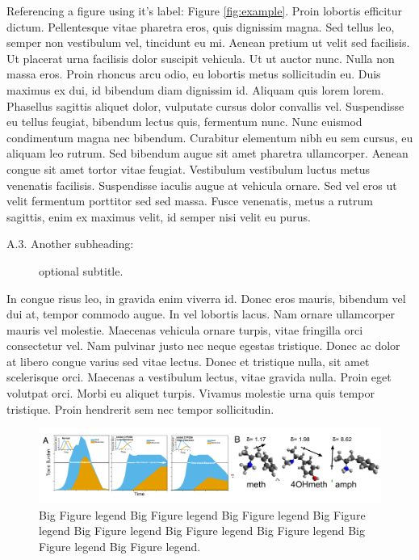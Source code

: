 Referencing a figure using it's label: Figure \ref{fig:example}. Proin lobortis efficitur dictum. Pellentesque vitae pharetra eros, quis dignissim magna. Sed tellus leo, semper non vestibulum vel, tincidunt eu mi. Aenean pretium ut velit sed facilisis. Ut placerat urna facilisis dolor suscipit vehicula. Ut ut auctor nunc. Nulla non massa eros. Proin rhoncus arcu odio, eu lobortis metus sollicitudin eu. Duis maximus ex dui, id bibendum diam dignissim id. Aliquam quis lorem lorem. Phasellus sagittis aliquet dolor, vulputate cursus dolor convallis vel. Suspendisse eu tellus feugiat, bibendum lectus quis, fermentum nunc. Nunc euismod condimentum magna nec bibendum. Curabitur elementum nibh eu sem cursus, eu aliquam leo rutrum. Sed bibendum augue sit amet pharetra ullamcorper. Aenean congue sit amet tortor vitae feugiat. Vestibulum vestibulum luctus metus venenatis facilisis. Suspendisse iaculis augue at vehicula ornare. Sed vel eros ut velit fermentum porttitor sed sed massa. Fusce venenatis, metus a rutrum sagittis, enim ex maximus velit, id semper nisi velit eu purus.

\begin{description}
	\item[A.3. Another subheading:]{optional subtitle.}
\end{description}

In congue risus leo, in gravida enim viverra id. Donec eros mauris, bibendum vel dui at, tempor commodo augue. In vel lobortis lacus. Nam ornare ullamcorper mauris vel molestie. Maecenas vehicula ornare turpis, vitae fringilla orci consectetur vel. Nam pulvinar justo nec neque egestas tristique. Donec ac dolor at libero congue varius sed vitae lectus. Donec et tristique nulla, sit amet scelerisque orci. Maecenas a vestibulum lectus, vitae gravida nulla. Proin eget volutpat orci. Morbi eu aliquet turpis. Vivamus molestie urna quis tempor tristique. Proin hendrerit sem nec tempor sollicitudin.

\begin{figure}[b] %
	\centering
	\includegraphics[scale = .80]{Figures/Fig2.pdf}
	\caption{\footnotesize Big Figure legend Big Figure legend Big Figure legend Big Figure legend Big Figure legend Big Figure legend Big Figure legend Big Figure legend Big Figure legend.}
	\label{fig2}
\end{figure}

